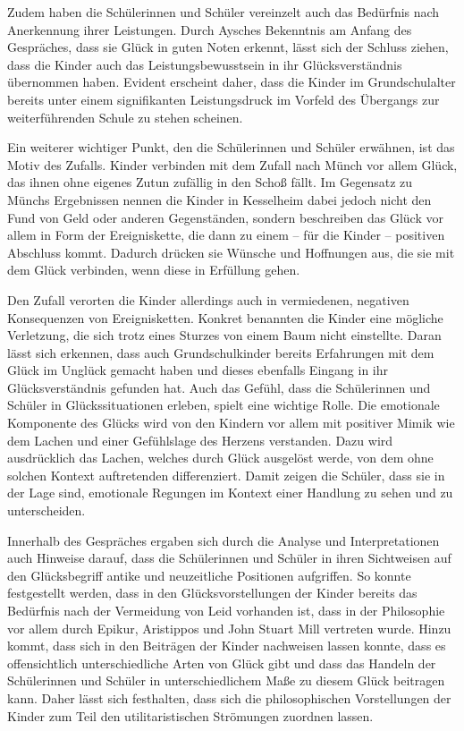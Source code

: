 Zudem haben die Schülerinnen und Schüler vereinzelt auch das Bedürfnis nach Anerkennung ihrer Leistungen. 
Durch Aysches Bekenntnis am Anfang des Gespräches, dass sie Glück in guten Noten erkennt,  lässt sich der Schluss ziehen, dass die Kinder auch das Leistungsbewusstsein in ihr Glücksverständnis übernommen haben. 
Evident erscheint daher, dass die Kinder im Grundschulalter bereits unter einem signifikanten Leistungsdruck im Vorfeld des Übergangs zur weiterführenden Schule zu stehen scheinen. 

Ein weiterer wichtiger Punkt, den die Schülerinnen und Schüler erwähnen, ist das Motiv des Zufalls. 
Kinder verbinden mit dem Zufall nach Münch vor allem Glück, \glqq das ihnen ohne eigenes Zutun zufällig in den Schoß fällt.\grqq{}\cite[S.\,62]{JM11}
Im Gegensatz zu Münchs Ergebnissen nennen die Kinder in Kesselheim dabei jedoch nicht den Fund von Geld oder anderen Gegenständen, sondern beschreiben das Glück vor allem in Form der Ereigniskette, die dann zu einem -- für die Kinder -- positiven Abschluss kommt. 
Dadurch drücken sie Wünsche und Hoffnungen aus, die sie mit dem Glück verbinden, wenn diese in Erfüllung gehen. 

Den Zufall verorten die Kinder allerdings auch in vermiedenen, negativen Konsequenzen von Ereignisketten. 
Konkret benannten die Kinder eine mögliche Verletzung, die sich trotz eines Sturzes von einem Baum nicht einstellte. 
Daran lässt sich erkennen, dass auch Grundschulkinder bereits Erfahrungen mit dem Glück im Unglück gemacht haben und dieses ebenfalls Eingang in ihr Glücksverständnis gefunden hat.
Auch das Gefühl, dass die Schülerinnen und Schüler in Glückssituationen erleben, spielt eine wichtige Rolle. 
Die emotionale Komponente des Glücks wird von den Kindern vor allem mit positiver Mimik wie dem Lachen und einer Gefühlslage des Herzens verstanden. 
Dazu wird ausdrücklich das Lachen, welches durch Glück ausgelöst werde, von dem ohne solchen Kontext auftretenden differenziert. 
Damit zeigen die Schüler, dass sie in der Lage sind, emotionale Regungen im Kontext einer Handlung zu sehen und zu unterscheiden. 

Innerhalb des Gespräches ergaben sich durch die Analyse und Interpretationen auch Hinweise darauf, dass die Schülerinnen und Schüler in ihren Sichtweisen auf den Glücksbegriff antike und neuzeitliche Positionen aufgriffen. 
So konnte festgestellt werden, dass in den Glücksvorstellungen der Kinder bereits das Bedürfnis nach der Vermeidung von Leid vorhanden ist, dass in der Philosophie vor allem durch Epikur, Aristippos und John Stuart Mill vertreten wurde. 
Hinzu kommt, dass sich in den Beiträgen der Kinder nachweisen lassen konnte, dass es offensichtlich unterschiedliche Arten von Glück gibt und dass das Handeln der Schülerinnen und Schüler in unterschiedlichem Maße zu diesem Glück beitragen kann. 
Daher lässt sich festhalten, dass sich die philosophischen Vorstellungen der Kinder zum Teil den utilitaristischen Strömungen zuordnen lassen. 

